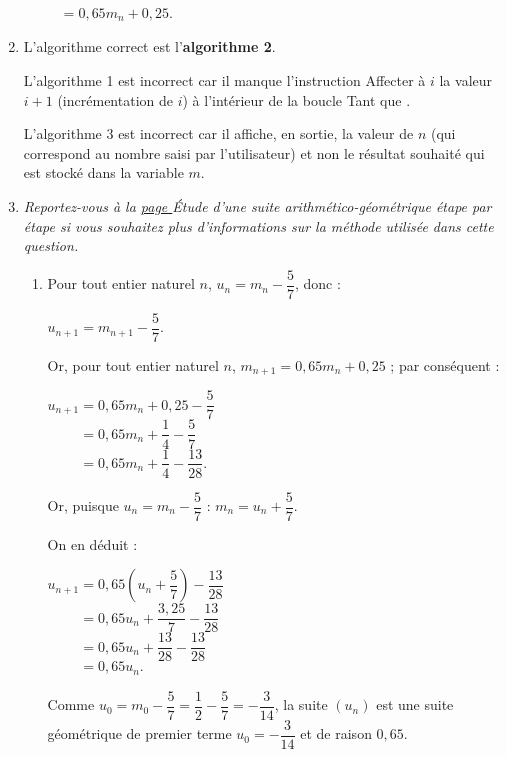 \begin{corrige}
\begin{enumerate}
     $\phantom{m_{n+1}	}	 		 = 0,65m_n+0,25.$
     \par
     \item %
     L'algorithme correct est l'\textbf{algorithme 2}.
     \par
     L'algorithme 1 est incorrect car il manque l'instruction \og Affecter à $i$ la valeur $i+1$ \fg{} (incrémentation de $i$) à l'intérieur de la boucle \og Tant que \fg{}.
     \par
     L'algorithme 3 est incorrect car il affiche, en sortie, la valeur de $n$ (qui correspond au nombre saisi par l'utilisateur) et non le résultat souhaité qui est stocké dans la variable $m$.
     \item %
     \textit{Reportez-vous à la \hyperlink{suite-ag-pap}{page \pageref*{suite-ag-pap}}  \og \'Etude d'une suite arithmético-géométrique étape par étape  \fg{} si vous souhaitez plus d'informations sur la méthode utilisée dans cette question.
     }
     \begin{enumerate}[label=\alph*.]
          \item %
          Pour tout entier naturel $n$, $u_{n}= m_{n}-\dfrac{5}{7}$, donc :
          \par
          $u_{n+1}= m_{n+1}-\dfrac{5}{7}$.
          \par
          Or, pour tout entier naturel $n$, $m_{n+1}=0,65m_n+0,25$ ; par conséquent :
          \par
          $u_{n+1}= 0,65m_n+0,25-\dfrac{5}{7}$\\
          $\phantom{u_{n+1}}=0,65m_n+\dfrac{1}{4}-\dfrac{5}{7}$\\
          $\phantom{u_{n+1}}=0,65m_n+\dfrac{1}{4}-\dfrac{13}{28}.$
          \par
          \par
          Or, puisque $u_{n}= m_{n}-\dfrac{5}{7}$ : $m_{n}= u_{n}+\dfrac{5}{7}$.
          \par
          On en déduit :
          \par
          $u_{n+1}= 0,65\left(u_{n}+\dfrac{5}{7}\right)-\dfrac{13}{28}$\\
          $\phantom{u_{n+1}}= 0,65u_{n}+\dfrac{3,25}{7}-\dfrac{13}{28}$\\
          $\phantom{u_{n+1}}= 0,65u_{n}+\dfrac{13}{28}-\dfrac{13}{28}$\\
          $\phantom{u_{n+1}}= 0,65u_{n}.$
          \par
          \par
          Comme $u_{0}= m_{0}-\dfrac{5}{7}=\dfrac{1}{2}-\dfrac{5}{7}=-\dfrac{3}{14}$, la suite $(u_n)$ est une suite géométrique de premier terme ${u_0=-\dfrac{3}{14}}$ et de raison $0,65$.

\end{enumerate}
\end{enumerate}
\end{corrige}
